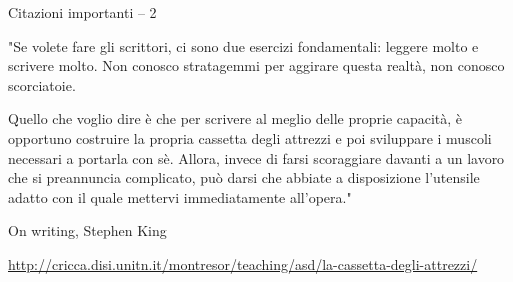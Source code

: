 %
%

\begin{frame}{Citazioni importanti -- 2}

\begin{mdframed}[style=mybox]
\small
"Se volete fare gli scrittori, ci sono due esercizi fondamentali: leggere molto
e scrivere molto. Non conosco stratagemmi per aggirare questa realtà, non
conosco scorciatoie. 

\bigskip
[...]

\bigskip
Quello che voglio dire è che per scrivere al meglio delle proprie capacità, è 
opportuno costruire la propria cassetta degli attrezzi e poi sviluppare i
muscoli necessari a portarla con sè. Allora, invece di farsi scoraggiare
davanti a un lavoro che si preannuncia complicato, può darsi che abbiate a
disposizione l'utensile adatto con il quale mettervi immediatamente all'opera."
\end{mdframed}

\begin{flushright}
On writing, Stephen King
\end{flushright}

\bigskip
{\tiny
\url{http://cricca.disi.unitn.it/montresor/teaching/asd/la-cassetta-degli-attrezzi/}
}

\end{frame}

